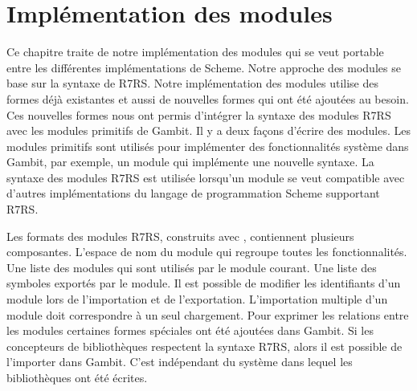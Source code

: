 
\chapter{Implémentation des modules}
\label{ch:modules_implementation}

Ce chapitre traite de notre implémentation des modules qui se veut portable
entre les différentes implémentations de Scheme.  Notre approche des modules se
base sur la syntaxe de R7RS.  Notre implémentation des modules utilise des
formes déjà existantes et aussi de nouvelles formes qui ont été ajoutées au
besoin.  Ces nouvelles formes nous ont permis d'intégrer la syntaxe des modules
R7RS avec les modules primitifs de Gambit. Il y a deux façons d'écrire des modules.
Les modules primitifs sont utilisés pour implémenter des fonctionnalités système
dans Gambit, par exemple, un module qui implémente une nouvelle syntaxe.
La syntaxe des modules R7RS est utilisée lorsqu'un module se veut compatible avec
d'autres implémentations du langage de programmation Scheme supportant R7RS.


Les formats des modules R7RS, construits avec , contiennent
plusieurs composantes. L'espace de nom du module qui regroupe toutes les
fonctionnalités. Une liste des modules qui sont utilisés par le module courant.
Une liste des symboles exportés par le module. Il est possible de modifier les
identifiants d'un module lors de l'importation et de l'exportation.
L'importation multiple d'un module doit correspondre à un seul chargement.
Pour exprimer les relations entre les modules certaines formes spéciales
ont été ajoutées dans Gambit.  Si les concepteurs de bibliothèques respectent
la syntaxe R7RS, alors il est possible de l'importer dans Gambit. C'est indépendant
du système dans lequel les bibliothèques ont été écrites.





